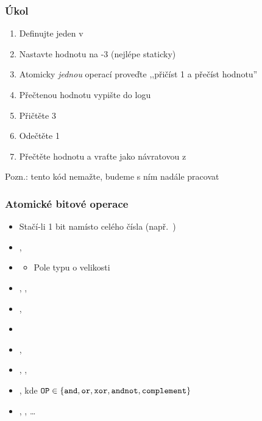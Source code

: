 \begin{frame}
  \frametitle{Úkol}

  \begin{enumerate}
    \item Definujte jeden  v 
    \item Nastavte hodnotu na -3 (nejlépe staticky)
    \item Atomicky \emph{jednou} operací proveďte ,,přičíst 1 a přečíst
      hodnotu''
    \item Přečtenou hodnotu vypište do logu
    \item Přičtěte 3
    \item Odečtěte 1
    \item Přečtěte hodnotu a vraťte jako návratovou z 
  \end{enumerate}

  \bigskip

  Pozn.: tento kód nemažte, budeme s ním nadále pracovat
\end{frame}

\begin{frame}
  \frametitle{Atomické bitové operace}

  \begin{itemize}
    \item Stačí-li 1 bit namísto celého čísla (např.\ )
    \item {}, 

    \pause

    \item {}
    \begin{itemize}
      \item Pole  typu  o velikosti
    \end{itemize}
    \item {}, , 

    \pause

    \item {}, 
  \end{itemize}

  \pause
  \medskip

  \begin{itemize}
    \item {}
    \item {}, 
    \item {}, , 
    \item {}, kde $\text{\code{OP}} \in \left\{\text{\code{and}},
      \text{\code{or}}, \text{\code{xor}}, \text{\code{andnot}},
      \text{\code{complement}}\right\}$
    \item {}, , \dots
  \end{itemize}

\end{frame}

